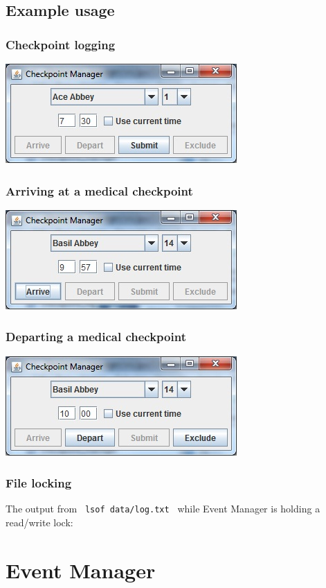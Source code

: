 \documentclass[a4paper, twoside]{article}
\begin{document}
\subsection{Example usage}
\subsubsection{Checkpoint logging}
\includegraphics{screenshot1.jpg}
\subsubsection{Arriving at a medical checkpoint}
\includegraphics{screenshot2.jpg}
\subsubsection{Departing a medical checkpoint}
\includegraphics{screenshot3.jpg}
\subsubsection{File locking}
The output from \verb+ lsof data/log.txt + while Event Manager is holding a
read/write lock:


\newpage

\section{Event Manager}
\end{document}
